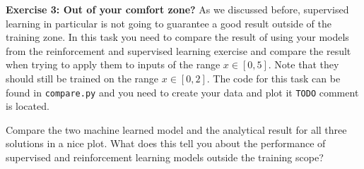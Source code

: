 \documentclass[12pt,a4paper]{article} %
\numberwithin{equation}{section}
\begin{document}
		\textbf{Exercise 3: Out of your comfort zone?}\newline
			As we discussed before, supervised learning in particular is not going to guarantee a good result outside of the training zone. In this task you need to compare the result of using your models from the reinforcement and supervised learning exercise and compare the result when trying to apply them to inputs of the range $x \in [0,5]$. Note that they should still be trained on the range $x \in [0,2]$. The code for this task can be found in \texttt{compare.py} and you need to create your data and plot it \texttt{TODO} comment is located.
			
			Compare the two machine learned model and the analytical result for all three solutions in a nice plot. What does this tell you about the performance of supervised and reinforcement learning models outside the training scope?
		
		
\end{document}

